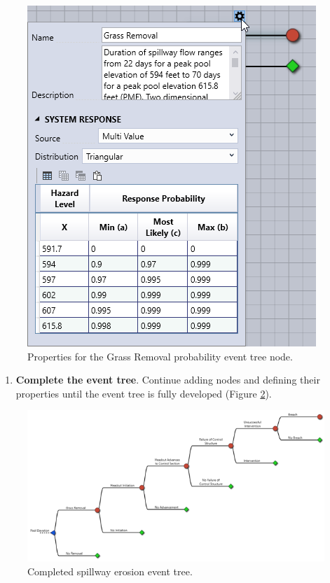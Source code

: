 \documentclass[
]{book}
\providecommand{\tightlist}{%
  \setlength{\itemsep}{0pt}\setlength{\parskip}{0pt}}
\begin{document}
\begin{figure}

{\centering \includegraphics{images/figure90} 

}

\caption{Properties for the Grass Removal probability event tree node.}\label{fig:figure-90}
\end{figure}

\begin{enumerate}
\def\labelenumi{\arabic{enumi}.}
\setcounter{enumi}{4}
\tightlist
\item
  \textbf{Complete the event tree}. Continue adding nodes and defining their properties until the event tree is fully developed (Figure \ref{fig:figure-91}).
\end{enumerate}

\begin{figure}

{\centering \includegraphics{images/figure91} 

}

\caption{Completed spillway erosion event tree.}\label{fig:figure-91}
\end{figure}
\end{document}
